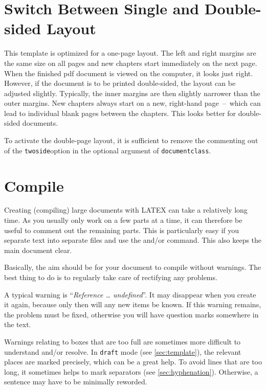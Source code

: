 \section{Switch Between Single and Double-sided Layout}
This template is optimized for a one-page layout. The left and right margins are 
the same size on all pages and new chapters start immediately on the next page. 
When the finished pdf document is viewed on the computer, it looks just right. 
However, if the document is to be printed double-sided, the layout can be 
adjusted slightly. Typically, the inner margins are then slightly narrower than 
the outer margins. New chapters always start on a new, right-hand page~--~which 
can lead to individual blank pages between the chapters. This looks better for 
double-sided documents.

To activate the double-page layout, it is sufficient to remove the commenting 
out of the \texttt{twoside}option in the optional argument of
\texttt{\tb documentclass}.

%
\section{Compile}
\label{sec:compilation}
Creating (compiling) large documents with LATEX can take a relatively long time. 
As you usually only work on a few parts at a time, it can therefore be useful to
comment out the remaining parts. This is particularly easy if you separate text 
into separate files and use the  and\slash or  
command. This also keeps the main document clear.

Basically, the aim should be for your document to compile without warnings. The 
best thing to do is to regularly take care of rectifying any problems.

A typical warning is \enquote{\emph{Reference \ldots{} undefined}}. It may 
disappear when you create it again, because only then will any new items be 
known. If this warning remains, the problem must be fixed, otherwise you will 
have question marks somewhere in the text.

Warnings relating to boxes that are too full are sometimes more difficult to 
understand and\slash or resolve. In \texttt{draft} mode (see 
\cref{sec:template}), the relevant places are marked precisely, which can be a 
great help. To avoid lines that are too long, it sometimes helps to mark 
separators (see \cref{sec:hyphenation}). Otherwise, a sentence may have to be 
minimally reworded.

